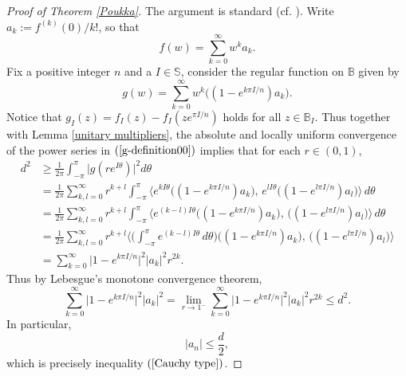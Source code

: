\documentclass{amsart}
\theoremstyle{definition}
\theoremstyle{remark}
\numberwithin{equation}{section}
\begin{document}
\begin{proof}[Proof of Theorem \ref{Poukka}]
The argument is standard (cf. \cite[p.149, Theorem 9.1]{BMMPR}). Write $a_k:=f^{(k)}(0)/k!$, so that
$$f(w)=\sum_{k=0}^{\infty}w^ka_k.$$
Fix a positive integer  $n$ and a $I\in\mathbb S$, consider  the regular function on $\mathbb B$ given by
\begin{equation}\label{g-definition00}
g(w)=\sum_{k=0}^{\infty}w^k\big((1-e^{k\pi I/n})a_k\big).
\end{equation}
Notice that $g_I(z)=f_I(z)-f_I(ze^{\pi I/n})$ holds for all $z\in \mathbb B_I$. Thus together with Lemma \ref{unitary multipliers}, the absolute and locally uniform convergence of the power series in $(\ref{g-definition00})$ implies that for each $r\in(0,1)$,
\begin{equation}\label{Area-consideration00}
\begin{split}
d^2&\geq\frac{1}{2\pi}\int_{-\pi}^{\pi}\big|g(re^{I\theta})\big|^{2}d\theta
\\
&=\frac{1}{2\pi}\sum_{k, l=0}^{\infty} r^{k+l}\int_{-\pi}^{\pi}\Big\langle e^{kI\theta}\big((1-e^{k\pi I/n})a_k\big),\, e^{lI\theta}\big((1-e^{l\pi I/n})a_l\big)\Big\rangle \,d\theta
\\
&=\frac{1}{2\pi}\sum_{k, l=0}^{\infty} r^{k+l}\int_{-\pi}^{\pi}\Big\langle e^{(k-l)I\theta}\big((1-e^{k\pi I/n})a_k\big),\, \big((1-e^{l\pi I/n})a_l\big)\Big\rangle\, d\theta
\\
&=\frac{1}{2\pi}\sum_{k, l=0}^{\infty} r^{k+l}\bigg\langle \bigg(\int_{-\pi}^{\pi}e^{(k-l)I\theta}\,d\theta\bigg)\big((1-e^{k\pi I/n})a_k\big),\, \big((1-e^{l\pi I/n})a_l\big)\bigg\rangle
\\
&=\sum_{k=0}^{\infty}\big|1-e^{k\pi I/n}\big|^2|a_k|^2r^{2k}.
\end{split}
\end{equation}
Thus by Lebesgue's monotone convergence theorem,
\begin{equation}\label{Area-consideration}
\sum_{k=0}^{\infty}\big|1-e^{k\pi I/n}\big|^2|a_k|^2=\lim\limits_{r\rightarrow 1^-} \sum_{k=0}^{\infty}\big|1-e^{k\pi I/n}\big|^2|a_k|^2r^{2k}\leq d^2.
\end{equation}
In particular,  $$|a_n|\leq \frac d2,$$
which is precisely inequality $(\ref{Cauchy type})$.


\end{proof}
\end{document}
